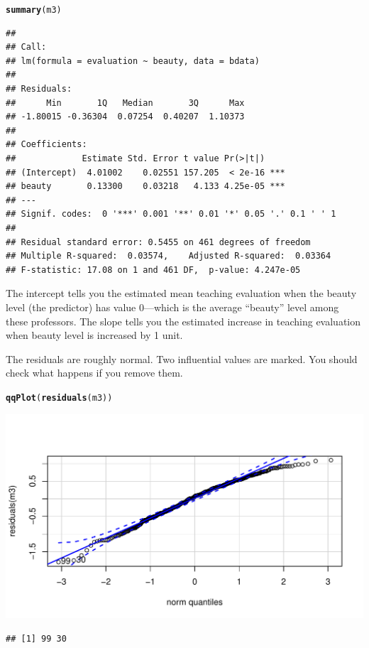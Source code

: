 \documentclass[12pt]{book}\usepackage[]{graphicx}\usepackage[]{color}
\makeatletter
\def\maxwidth{ %
  \ifdim\Gin@nat@width>\linewidth
    \linewidth
  \else
    \Gin@nat@width
  \fi
}
\newcommand{\hlstd}[1]{\textcolor[rgb]{0.345,0.345,0.345}{#1}}%
\newcommand{\hlkwd}[1]{\textcolor[rgb]{0.737,0.353,0.396}{\textbf{#1}}}%
\newenvironment{kframe}{%
 \def\at@end@of@kframe{}%
 \ifinner\ifhmode%
  \def\at@end@of@kframe{\end{minipage}}%
  \begin{minipage}{\columnwidth}%
 \fi\fi%
 \def\FrameCommand##1{\hskip\@totalleftmargin \hskip-\fboxsep
 \colorbox{shadecolor}{##1}\hskip-\fboxsep
     \hskip-\linewidth \hskip-\@totalleftmargin \hskip\columnwidth}%
 \MakeFramed {\advance\hsize-\width
   \@totalleftmargin\z@ \linewidth\hsize
   \@setminipage}}%
 {\par\unskip\endMakeFramed%
 \at@end@of@kframe}
\newenvironment{knitrout}{}{} %
\makeatother
\begin{document}
\begin{knitrout}
\color{fgcolor}\begin{kframe}
\begin{alltt}
\hlkwd{summary}\hlstd{(m3)}
\end{alltt}
\begin{verbatim}
## 
## Call:
## lm(formula = evaluation ~ beauty, data = bdata)
## 
## Residuals:
##      Min       1Q   Median       3Q      Max 
## -1.80015 -0.36304  0.07254  0.40207  1.10373 
## 
## Coefficients:
##             Estimate Std. Error t value Pr(>|t|)    
## (Intercept)  4.01002    0.02551 157.205  < 2e-16 ***
## beauty       0.13300    0.03218   4.133 4.25e-05 ***
## ---
## Signif. codes:  0 '***' 0.001 '**' 0.01 '*' 0.05 '.' 0.1 ' ' 1
## 
## Residual standard error: 0.5455 on 461 degrees of freedom
## Multiple R-squared:  0.03574,	Adjusted R-squared:  0.03364 
## F-statistic: 17.08 on 1 and 461 DF,  p-value: 4.247e-05
\end{verbatim}
\end{kframe}
\end{knitrout}

The intercept tells you the estimated mean teaching evaluation when the beauty level (the predictor) has value 0---which is the average ``beauty'' level among these professors. The slope tells you the estimated increase in teaching evaluation when beauty level is increased by 1 unit.

The residuals are roughly normal. Two influential values are marked. You should check what happens if you remove them.

\begin{knitrout}
\color{fgcolor}\begin{kframe}
\begin{alltt}
\hlkwd{qqPlot}\hlstd{(}\hlkwd{residuals}\hlstd{(m3))}
\end{alltt}
\end{kframe}
\includegraphics[width=\maxwidth]{figure/unnamed-chunk-112-1} 
\begin{kframe}\begin{verbatim}
## [1] 99 30
\end{verbatim}
\end{kframe}
\end{knitrout}
\end{document}
